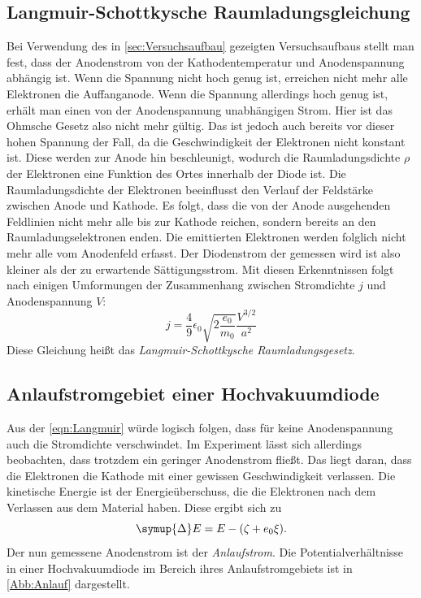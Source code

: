 \subsection{Langmuir-Schottkysche Raumladungsgleichung}
Bei Verwendung des in \autoref{sec:Versuchsaufbau} gezeigten Versuchsaufbaus stellt man 
fest, dass der Anodenstrom von der Kathodentemperatur und Anodenspannung abhängig ist. Wenn
die Spannung nicht hoch genug ist, erreichen nicht mehr alle Elektronen
die Auffanganode. Wenn die Spannung allerdings hoch genug ist, erhält man einen von der
Anodenspannung unabhängigen Strom. Hier ist das Ohmsche Gesetz also nicht mehr gültig.
Das ist jedoch auch bereits vor dieser hohen Spannung der Fall, da die Geschwindigkeit der
Elektronen nicht konstant ist. Diese werden zur Anode hin beschleunigt, wodurch die 
Raumladungsdichte $\rho$ der Elektronen eine Funktion des Ortes innerhalb der Diode ist. Die 
Raumladungsdichte der Elektronen beeinflusst den Verlauf der Feldstärke zwischen Anode und Kathode.
Es folgt, dass die von der Anode ausgehenden Feldlinien nicht mehr alle bis zur Kathode reichen,
sondern bereits an den Raumladungselektronen enden. Die emittierten Elektronen werden
folglich nicht mehr alle vom Anodenfeld erfasst. Der Diodenstrom der gemessen wird ist also
kleiner als der zu erwartende Sättigungsstrom. Mit diesen Erkenntnissen folgt nach einigen
Umformungen der Zusammenhang zwischen Stromdichte $j$ und Anodenspannung $V$:
\begin{equation}
    \label{eqn:Langmuir}
    j = \frac{4}{9} \epsilon_0 \sqrt{2 \frac{e_0}{m_0}} \frac{V^{3/2}}{a^2}
\end{equation}
Diese Gleichung heißt das \textit{Langmuir-Schottkysche Raumladungsgesetz}.

\subsection{Anlaufstromgebiet einer Hochvakuumdiode}

Aus der \autoref{eqn:Langmuir} würde logisch folgen, dass für keine Anodenspannung auch
die Stromdichte verschwindet. Im Experiment lässt sich allerdings beobachten, dass trotzdem
ein geringer Anodenstrom fließt. Das liegt daran, dass die Elektronen die Kathode mit einer gewissen 
Geschwindigkeit verlassen. Die kinetische Energie ist der Energieüberschuss, die die Elektronen
nach dem Verlassen aus dem Material haben. Diese ergibt sich zu
\begin{equation}
    \symup{\Delta} E = E - (\zeta + e_0 \xi).
\end{equation}
Der nun gemessene Anodenstrom ist der \textit{Anlaufstrom}. Die Potentialverhältnisse
in einer Hochvakuumdiode im Bereich ihres Anlaufstromgebiets ist in \autoref{Abb:Anlauf}
dargestellt.

